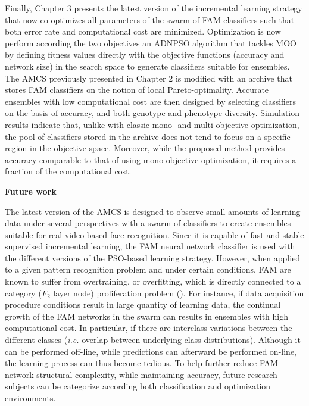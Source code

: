 Finally, Chapter 3 presents the latest version of the incremental learning strategy that now co-optimizes all parameters of the swarm of FAM classifiers such that both error rate and computational cost are minimized. 
Optimization is now perform according the two objectives an ADNPSO algorithm that tackles MOO by defining fitness values directly with the objective functions (accuracy and network size) in the search space to generate classifiers suitable for ensembles.
The AMCS previously presented in Chapter 2 is modified with an archive that stores FAM classifiers on the notion of local Pareto-optimality.
Accurate ensembles with low computational cost are then designed by selecting classifiers on the basis of accuracy, and both genotype and phenotype diversity.
Simulation results indicate that, unlike with classic mono- and multi-objective optimization, the pool of classifiers stored in the archive does not tend to focus on a specific region in the objective space.
Moreover, while the proposed method provides accuracy comparable to that of using mono-objective optimization, it requires a fraction of the computational cost.


\noindent\textbf{Future work}

The latest version of the AMCS is designed to observe small amounts of learning data under several perspectives with a swarm of classifiers to create ensembles suitable for real video-based face recognition.
Since it is capable of fast and stable supervised incremental learning, the FAM neural network classifier is used with the different versions of the PSO-based learning strategy.
However, when applied to a given pattern recognition problem and under certain conditions, FAM are known to suffer from overtraining, or overfitting, which is directly connected to a category ($F_2$ layer node) proliferation problem (\cite{connolly08, henniges05, koufakou01}).
For instance, if data acquisition procedure conditions result in large quantity of learning data, the continual growth of the FAM networks in the swarm can results in ensembles with high computational cost. 
In particular, if there are interclass variations between the different classes (\emph{i.e.} overlap between underlying class distributions).
Although it can be performed off-line, while predictions can afterward be performed on-line, the learning process can thus become tedious.
To help further reduce FAM network structural complexity, while maintaining accuracy, future research subjects can be categorize according both classification and optimization environments.

